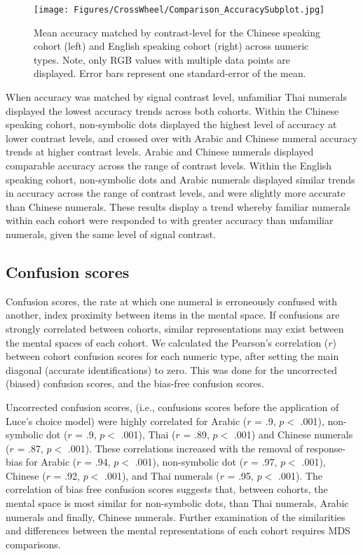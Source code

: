 \begin{figure}[tbh]
\centering \texttt{[image: Figures/CrossWheel/Comparison\_AccuracySubplot.jpg]}
\caption{Mean accuracy matched by contrast-level for the Chinese speaking cohort (left) and English speaking cohort (right) across numeric types. Note, only RGB values with multiple data points are displayed. Error bars represent one standard-error of the mean.}
\label{fig:ComparedAccuracy}
\end{figure}

When accuracy was matched by signal contrast level, unfamiliar Thai numerals displayed the lowest accuracy trends across both cohorts. Within the Chinese speaking cohort, non-symbolic dots displayed the highest level of accuracy at lower contrast levels, and crossed over with Arabic and Chinese numeral accuracy trends at higher contrast levels. Arabic and Chinese numerals displayed comparable accuracy across the range of contrast levels. Within the English speaking cohort, non-symbolic dots and Arabic numerals displayed similar trends in accuracy across the range of contrast levels, and were slightly more accurate than Chinese numerals. These results display a trend whereby familiar numerals within each cohort were responded to with greater accuracy than unfamiliar numerals, given the same level of signal contrast. 

\subsection{Confusion scores}
Confusion scores, the rate at which one numeral is erroneously confused with another, index proximity between items in the mental space. If confusions are strongly correlated between cohorts, similar representations may exist between the mental spaces of each cohort. We calculated the Pearson's correlation ($r$) between cohort confusion scores for each numeric type, after setting the main diagonal (accurate identifications) to zero. This was done for the uncorrected (biased) confusion scores, and the bias-free confusion scores. 

Uncorrected confusion scores, (i.e., confusions scores before the application of Luce's choice model) were highly correlated for Arabic ($r$ = .9, $p <$ .001), non-symbolic dot ($r$ = .9, $p <$ .001), Thai ($r$ = .89, $p <$ .001) and Chinese numerals ($r$ = .87, $p <$ .001). These correlations increased with the removal of response-bias for Arabic ($r$ = .94, $p <$ .001), non-symbolic dot ($r$ = .97, $p <$ .001), Chinese ($r$ = .92, $p <$ .001), and Thai numerals ($r$ = .95, $p <$ .001). The correlation of bias free confusion scores suggests that, between cohorts, the mental space is most similar for non-symbolic dots, than Thai numerals, Arabic numerals and finally, Chinese numerals. Further examination of the similarities and differences between the mental representations of each cohort requires MDS comparisons.

